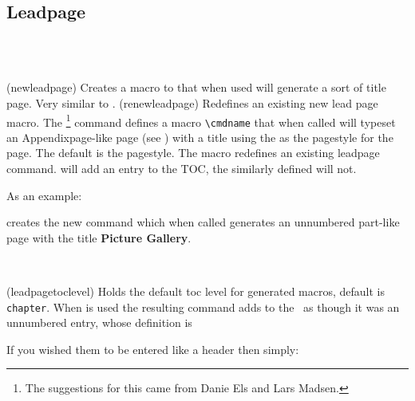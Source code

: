 
\subsection{Leadpage}

\begin{syntax}
\cmd{\newleadpage} \\
\cmd{\renewleadpage} \\
\end{syntax}
\glossary(newleadpage)%
{}%
{Creates a macro to that when used will generate a sort of title
page. Very similar to .}
\glossary(renewleadpage)%
{}%
{Redefines an existing new lead page macro.}
The \cmd{\newleadpage}\footnote{The suggestions for this came from
Danie Els and Lars Madsen.}
command defines a macro \verb?\cmdname? that when called
will typeset an Appendixpage-like page (see ) with a
title  using the  as the pagestyle for
the page. The default is the  pagestyle. The macro
\cmd{\renewleadpage} redefines an existing leadpage command.
\cmd{\cmdname} will add an entry to the TOC, the similarly defined
\cmd{\cmdname*} will not.


As an example:
\begin{lcode}
\end{lcode}
creates the new command  which when called generates an unnumbered
part-like page with the title \textbf{Picture Gallery}.

\begin{syntax}
\cmd{\leadpagetoclevel} \\
\end{syntax}
\glossary(leadpagetoclevel)%
{}%
{Holds the default toc level for  generated macros,
default is \texttt{chapter}.}
When  is used the resulting command adds 
to the \toc\ as though it was an unnumbered \cmd{\leadpagetoclevel} entry,
whose definition is
\begin{lcode}
\newcommand*{\leadpagetoclevel}{chapter}
\end{lcode}
If you wished them to be entered like a \cmd{\part} header then simply:
\begin{lcode}
\renewcommand*{\leadpagetoclevel}{part}
\end{lcode}



